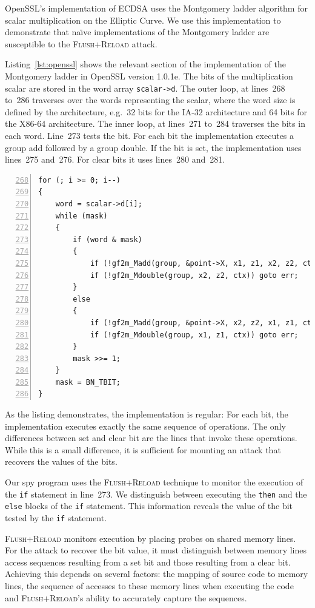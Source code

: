 \documentclass[twocolumn]{svjour3}
\begin{document}
OpenSSL's implementation of ECDSA uses the Montgomery ladder algorithm for scalar multiplication
on the Elliptic Curve.
We use this implementation to demonstrate that na{\"\i}ve implementations of the Montgomery ladder are
susceptible to the \textsc{Flush+Reload} attack.

Listing~\ref{lst:openssl} shows the relevant section of the implementation of the Montgomery ladder in OpenSSL version 1.0.1e.
The bits of the multiplication scalar are stored in the word array \texttt{scalar->d}.
The outer loop, at lines~268 to~286 traverses over the words representing the scalar,
where the word size is defined by the architecture, e.g.\ 32 bits for the IA-32 architecture and 64 bits for the X86-64 architecture.
The inner loop, at lines~271 to~284 traverses the bits in each word.
Line~273 tests the bit. 
For each bit the implementation executes a group add followed by a group double.
If the bit is set, the implementation uses lines~275 and~276.
For clear bits it uses lines~280 and~281.

\begin{lstlisting}[numbers=left,firstnumber=268,float=htb,caption=OpenSSL Implementation of the Montgomery Ladder,label=lst:openssl]
for (; i >= 0; i--)
{
    word = scalar->d[i];
    while (mask)
    {
        if (word & mask)
        {
            if (!gf2m_Madd(group, &point->X, x1, z1, x2, z2, ctx)) goto err;
            if (!gf2m_Mdouble(group, x2, z2, ctx)) goto err;
        }
        else
        {
            if (!gf2m_Madd(group, &point->X, x2, z2, x1, z1, ctx)) goto err;
            if (!gf2m_Mdouble(group, x1, z1, ctx)) goto err;
        }
        mask >>= 1;
    }
    mask = BN_TBIT;
}
\end{lstlisting}

As the listing demonstrates, the implementation is regular: For each bit, the implementation executes exactly the same sequence of operations.
The only differences between set and clear bit are the lines that invoke these operations.
While this is a small difference, it is sufficient for mounting an attack that recovers 
the values of the bits.


Our spy program uses the \textsc{Flush+Reload} technique to monitor the execution of the \texttt{if}
statement in line~273.
We distinguish between executing the \texttt{then} and the \texttt{else} blocks of the \texttt{if}
statement.
This information reveals the value of the bit tested by the \texttt{if} statement.

\textsc{Flush+Reload} monitors execution by placing probes on shared memory lines.
For the attack to recover the bit value, it must distinguish between memory lines access sequences
resulting from a set bit and those resulting from a clear bit.
Achieving this depends on several factors: the mapping of source code to memory lines, 
the sequence of accesses to these memory lines when executing the code and 
\textsc{Flush+Reload}'s ability to accurately capture the sequences.
\end{document}
